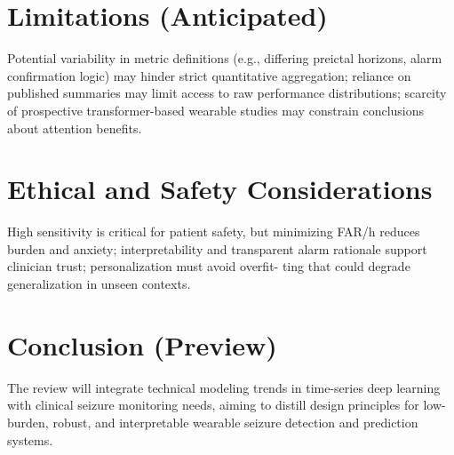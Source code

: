 \section*{Limitations (Anticipated)}
Potential variability in metric definitions (e.g., differing preictal
horizons, alarm confirmation logic) may hinder strict quantitative
aggregation; reliance on published summaries may limit access to raw
performance distributions; scarcity of prospective transformer-based
wearable studies may constrain conclusions about attention benefits.

\section*{Ethical and Safety Considerations}
High sensitivity is critical for patient safety, but minimizing FAR/h
reduces burden and anxiety; interpretability and transparent alarm
rationale support clinician trust; personalization must avoid overfit-
ting that could degrade generalization in unseen contexts.

\section*{Conclusion (Preview)}
The review will integrate technical modeling trends in time-series deep
learning with clinical seizure monitoring needs, aiming to distill
design principles for low-burden, robust, and interpretable wearable
seizure detection and prediction systems.
